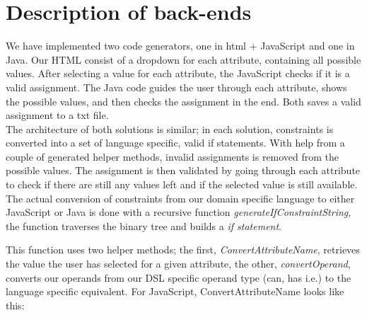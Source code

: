 \documentclass[paper=a4, fontsize=11pt]{scrartcl} %
\numberwithin{equation}{section} %
\numberwithin{figure}{section} %
\numberwithin{table}{section} %
\begin{document}
\section{Description of back-ends}
We have implemented two code generators, one in html + JavaScript and one in Java. Our HTML consist of a dropdown for each attribute, containing all possible values. After selecting a value for each attribute, the JavaScript checks if it is a valid assignment. The Java code guides the user through each attribute, shows the possible values, and then checks the assignment in the end. Both saves a valid assignment to a txt file.\\

The architecture of both solutions is similar; in each solution, constraints is converted into a set of language specific, valid if statements. With help from a couple of generated helper methods, invalid assignments is removed from the possible values. The assignment is then validated by going through each attribute to check if there are still any values left and if the selected value is still available.\\
The actual conversion of constraints from our domain specific language to either JavaScript or Java is done with a recursive function \textit{generateIfConstraintString}, the function traverses the binary tree and builds a \textit{if statement}. 



This function uses two helper methods; the first, \textit{ConvertAttributeName}, retrieves the value the user has selected for a given attribute, the other, \textit{convertOperand}, converts our operands from our DSL specific operand type (can, has i.e.) to the language specific equivalent.
For JavaScript, ConvertAttributeName looks like this:


\end{document}
